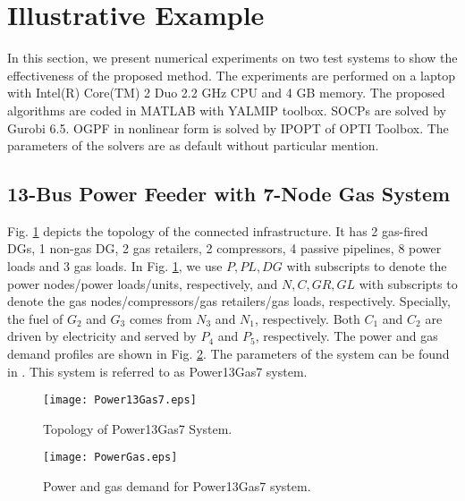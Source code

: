 \documentclass[journal]{IEEEtran}
\begin{document}
\section{Illustrative Example}
In this section, we present numerical experiments on two test systems to show the effectiveness of the proposed method. The experiments are performed on a laptop with Intel(R) Core(TM) 2 Duo 2.2 GHz CPU and 4 GB memory. The proposed algorithms are coded in MATLAB with YALMIP toolbox. SOCPs are solved by Gurobi 6.5. OGPF in nonlinear form is solved by IPOPT of OPTI Toolbox. The parameters of the solvers are as default without particular mention.

\subsection{13-Bus Power Feeder with 7-Node Gas System}
Fig. \ref{fig:Topology_P13G7} depicts the topology of the connected infrastructure. It has 2 gas-fired DGs, 1 non-gas DG, 2 gas retailers, 2 compressors, 4 passive pipelines, 8 power loads and 3 gas loads. In Fig. \ref{fig:Topology_P13G7}, we use $P,PL,DG$ with subscripts to denote the power nodes/power loads/units, respectively, and $N,C,GR,GL$ with subscripts to denote the gas nodes/compressors/gas retailers/gas loads, respectively. Specially, the fuel of $G_2$ and $G_3$ comes from $N_3$ and $N_1$, respectively. Both $C_1$ and $C_2$ are driven by electricity and served by $P_4$ and $P_5$, respectively. The power and gas demand profiles are shown in Fig. \ref{fig:Demand}. The parameters of the system can be found in \cite{Power6Gas7}. This system is referred to as Power13Gas7 system.
\begin{figure}
\centering
  \texttt{[image: Power13Gas7.eps]}
  \caption{Topology of Power13Gas7 System.}
  \label{fig:Topology_P13G7}
\end{figure}
\begin{figure}
\centering
  \texttt{[image: PowerGas.eps]}
  \caption{Power and gas demand for Power13Gas7 system.}
  \label{fig:Demand}
\end{figure}
\end{document}
